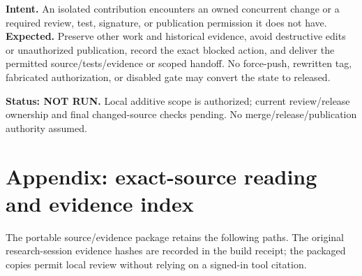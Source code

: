 \documentclass[10pt,letterpaper]{article}
\begin{document}
\textbf{Intent.} An isolated contribution encounters an owned concurrent
change or a required review, test, signature, or publication permission
it does not have. \textbf{Expected.} Preserve other work and historical
evidence, avoid destructive edits or unauthorized publication, record
the exact blocked action, and deliver the permitted
source/tests/evidence or scoped handoff. No force-push, rewritten tag,
fabricated authorization, or disabled gate may convert the state to
released.

\textbf{Status: NOT RUN.} Local additive scope is authorized; current
review/release ownership and final changed-source checks pending. No
merge/release/publication authority assumed.

\hypertarget{appendix-exact-source-reading-and-evidence-index}{%
\section{Appendix: exact-source reading and evidence
index}\label{appendix-exact-source-reading-and-evidence-index}}

The portable source/evidence package retains the following paths. The
original research-session evidence hashes are recorded in the build
receipt; the packaged copies permit local review without relying on a
signed-in tool citation.
\end{document}
